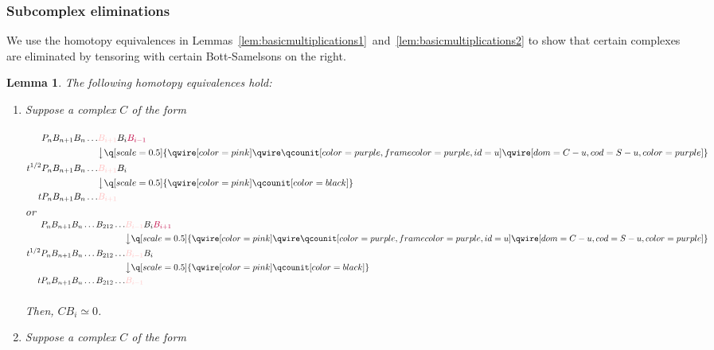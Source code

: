 \documentclass[11pt]{article}
\newtheorem{lemma}[thm]{Lemma}
\theoremstyle{definition}
\theoremstyle{remark}
\numberwithin{equation}{section}
\begin{document}
\subsubsection{Subcomplex eliminations}
\label{ssec:subcomplexeliminations}
We use the homotopy equivalences in
Lemmas~\ref{lem:basicmultiplications1}~and~\ref{lem:basicmultiplications2} to
show that certain complexes are eliminated by tensoring with certain Bott-Samelsons
on the right.
\begin{lemma}
	\label{lem:subcomplexeliminations}
	The following homotopy equivalences hold:
	\begin{enumerate}[label=(\arabic*)]
		\item Suppose a complex $C$ of the form\\\\
{\centering
$
{\begin{aligned}
	P_nB_{n+1} B_n \dots &\textcolor{pink}{B_{i+1}} B_{i}
		\textcolor{purple}{B_{i-1}}
	\\
			     &{\big\downarrow}
			     \q[scale=0.5]{\qwire[color=pink] \qwire
			     \qcounit[color=purple, frame color=purple, id=u]
		     \qwire[dom=C-u, cod=S-u, color=purple]}
	\\
	t^{1/2}P_nB_{n+1}B_n\dots &\textcolor{pink}{B_{i+1}} B_i
	\\
&{\big\downarrow} \q[scale=0.5]{\qwire[color=pink]
\qcounit[color=black]}
	\\
	t P_n B_{n+1}B_n\dots &\textcolor{pink}{B_{i+1}}
\end{aligned}}$
\hspace{0.05\textwidth}or\hspace{0.05\textwidth}
${\begin{aligned}
	P_nB_{n+1} B_n \dots B_{212}\dots  &\textcolor{pink}{B_{i-1}} B_{i}
		\textcolor{purple}{B_{i+1}}
	\\
			     &{\big\downarrow}
			     \q[scale=0.5]{\qwire[color=pink] \qwire
			     \qcounit[color=purple, frame color=purple, id=u]
		     \qwire[dom=C-u, cod=S-u, color=purple]}
	\\
	t^{1/2}P_nB_{n+1}B_n\dots B_{212}\dots&\textcolor{pink}{B_{i-1}} B_i
	\\
&{\big\downarrow} \q[scale=0.5]{\qwire[color=pink]
\qcounit[color=black]}
	\\
	t P_n B_{n+1}B_n\dots B_{212}\dots &\textcolor{pink}{B_{i-1}}
\end{aligned}}$
}\\\\
Then, $CB_i\simeq 0$.
\item Suppose a complex $C$ of the form

\end{enumerate}
\end{lemma}
\end{document}
